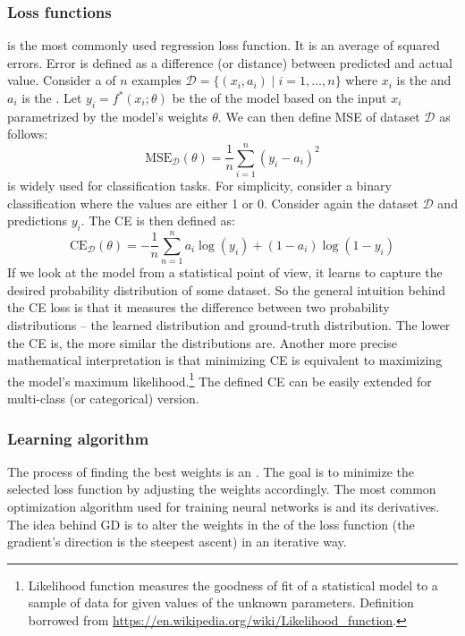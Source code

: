     \subsubsection{Loss functions}

     is the most commonly used regression loss
    function. It is an average of squared errors. Error is defined as a difference
    (or distance) between predicted and actual value. Consider a  of $n$
    examples $\mathcal{D} = \{(x_i, a_i)\mid i = 1,...,n\}$ where $x_i$ is the 
    and $a_i$ is the . Let $y_i = f^*(x_i; \theta)$ be the  of the model based on the input $x_i$ parametrized by the model's weights
$\theta$. We can then define MSE of dataset $\mathcal{D}$ as follows:
    $$
        \text{MSE}_{\mathcal{D}}(\theta) =
        \frac{1}{n}\sum\limits^{n}_{i=1}(y_i - a_i)^2
    $$
     is widely used for classification tasks. For
    simplicity, consider a binary classification where the values are either 1 or 0.
    Consider again the dataset $\mathcal{D}$ and predictions $y_i$. The CE is then
    defined as:
    $$
        \text{CE}_\mathcal{D}(\theta) =
        -\frac{1}{n}\sum\limits_{n=1}^{n} a_i \log(y_i) + (1-a_i)\log(1-y_i)
    $$
    If we look at the model from a statistical point of view, it learns to capture
    the desired probability distribution of some dataset. So the general intuition
    behind the CE loss is that it measures the difference between two probability
    distributions -- the learned distribution and ground-truth distribution. The
    lower the CE is, the more similar the distributions are. Another more precise
    mathematical interpretation is that minimizing CE is equivalent to maximizing
    the model's maximum likelihood.\footnote{Likelihood function measures the
        goodness of fit of a statistical model to a sample of data for given values
        of the unknown parameters. Definition borrowed from
        \url{https://en.wikipedia.org/wiki/Likelihood_function}.
    } The defined CE can be easily extended for multi-class (or categorical)
    version.

    \subsubsection{Learning algorithm}
    The process of finding the best weights is an . The
    goal is to minimize the selected loss function by adjusting the weights
    accordingly. The most common optimization algorithm used for training neural
    networks is  and its derivatives. The idea behind GD
    is to alter the weights in the  of the
    loss function (the gradient's direction is the steepest ascent) in an iterative
    way.

